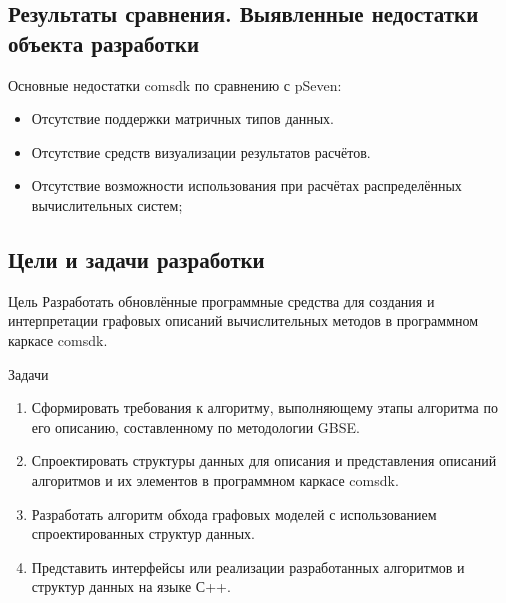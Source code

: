 \subsection{Результаты сравнения. Выявленные недостатки объекта разработки}
\begin{frame}
    Основные недостатки comsdk по сравнению с pSeven:
    \begin{itemize}
        \item Отсутствие поддержки матричных типов данных.
        \item Отсутствие средств визуализации результатов расчётов.
        \item Отсутствие возможности использования при расчётах распределённых вычислительных систем;
    \end{itemize}
\end{frame}

\subsection{Цели и задачи разработки}
\begin{frame}

    \begin{block}{Цель}
        Разработать обновлённые программные средства для создания и интерпретации графовых описаний вычислительных методов в программном каркасе comsdk.
    \end{block}

    \begin{block}{Задачи}
        \begin{enumerate}
            \item Сформировать требования к алгоритму, выполняющему этапы алгоритма по его описанию, составленному по методологии GBSE.
            \item Спроектировать структуры данных для описания и представления описаний алгоритмов и их элементов в программном каркасе comsdk.
            \item Разработать алгоритм обхода графовых моделей с использованием спроектированных структур данных.
            \item Представить интерфейсы или реализации разработанных алгоритмов и структур данных на языке С++.
        \end{enumerate}
    \end{block}

\end{frame}